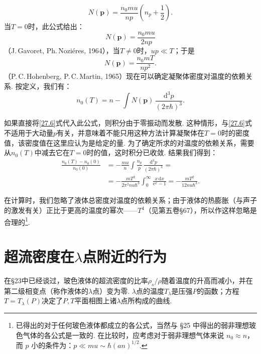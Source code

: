 \begin{equation}
N(\bm{p})=\frac{n_{0}mu}{np}\left(n_{p}+\frac{1}{2}\right).
\label{27.6}
\end{equation}
当$T=0$时，此公式给出：
\begin{equation}
N(\bm{p})=\frac{n_{0}mu}{2np}
\label{27.7}
\end{equation}
（J.\,Gavoret, Ph.\,Nozi\'eres, 1964），当$T\neq 0$时，$up\ll T$；于是
\begin{equation}
N(\bm{p})=\frac{n_{0}mT}{np^{2}}.
\label{27.8}
\end{equation}
（P.\,C.\,Hohenberg, P.\,C.\,Martin, 1965）现在可以确定凝聚体密度对温度的依赖关系. 按定义，我们有：
\begin{equation}
n_{0}(T)=n-\int N(\bm{p})\,\frac{\mathrm{d}^{3}p}{(2\pi\hbar)^{3}}.
\label{27.9}
\end{equation}

如果直接将\eqref{27.6}式代入此公式，则积分由于零振动而发散. 这种情形，与\eqref{27.6}式不适用于大动量$p$有关，并意味着不能只用这种方法计算凝聚体在$T=0$时的密度值，该密度值在这里应认为是给定的量. 为了确定所求的对温度的依赖关系，需要从$n_{0}(T)$中减去它在$T=0$时的值，这时积分已收敛. 结果我们得到：
\begin{equation}
\begin{aligned}
\frac{n_{0}(T)-n_{0}(0)}{n_{0}(0)}
&=-\frac{mu}{n}\int\frac{n_{p}}{p}\,\frac{\mathrm{d}^{3}p}{(2\pi\hbar)^{3}}={}\\
&=-\frac{mT^{2}}{2\pi^{2}nu\hbar^{3}}\int_{0}^{\infty}\frac{x\,\mathrm{d}x}{\mathrm{e}^{x}-1}
=-\frac{mT^{2}}{12nu\hbar^{3}}.
\end{aligned}
\label{27.10}
\end{equation}

在计算时，我们忽略了液体总密度对温度的依赖关系；由于液体的热膨胀（与声子的激发有关）正比于更高的温度的幂次——$T^{4}$（见第五卷§67），所以作这样忽略是合理的\footnote{已得出的对于任何玻色液体都成立的各公式，当然与 §25 中得出的弱非理想玻色气体的各公式是一致的. 在比较时，应考虑对于弱非理想气体来说 $n_{0}\approx n$，而 $p$ 小的条件为：$p\ll mu\sim\hbar(an)^{1/2}$.}.

\section{超流密度在$\lambda$点附近的行为}

在§23中已经谈过，玻色液体的超流密度的比率$\rho_{s}/\rho$随着温度的升高而减小，并在第二级相变点（称作液体的$\lambda$点）变为零. $\lambda$点的温度$T_{\lambda}$是压强$P$的函数；方程$T=T_{\lambda}(P)$决定了$P,T$平面相图上诸$\lambda$点所构成的曲线.

